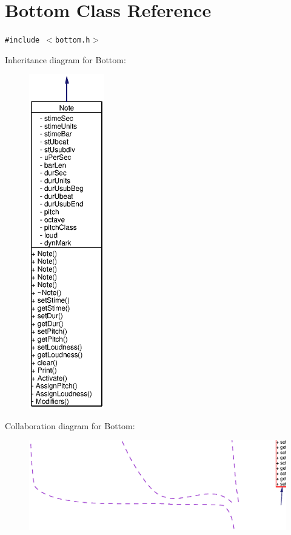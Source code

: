 \section{Bottom Class Reference}
\label{classBottom}
{\tt \#include $<$bottom.h$>$}

Inheritance diagram for Bottom:\begin{figure}[H]
\begin{center}
\leavevmode
\includegraphics[width=93pt]{classBottom__inherit__graph}
\end{center}
\end{figure}
Collaboration diagram for Bottom:\begin{figure}[H]
\begin{center}
\leavevmode
\includegraphics[width=420pt]{classBottom__coll__graph}
\end{center}
\end{figure}
